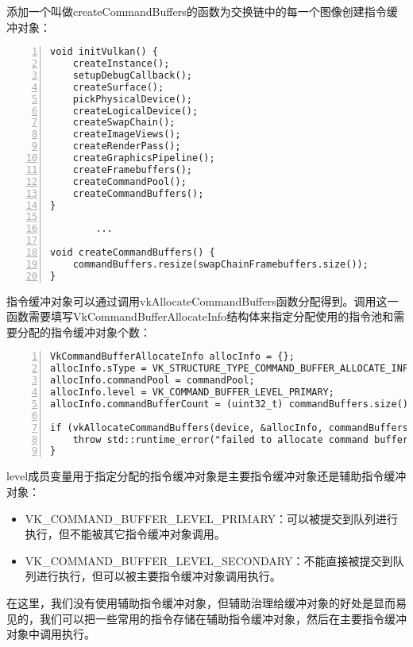 \documentclass{ctexart}
\begin{document}
添加一个叫做createCommandBuffers的函数为交换链中的每一个图像创建指令缓冲对象：

\begin{lstlisting}[language={[ANSI]C},keywordstyle=\color{blue!70},commentstyle=\color{red!50!green!50!blue!50},frame=shadowbox, rulesepcolor=\color{red!20!green!20!blue!20},basicstyle=\small,numbers=left, numberstyle=\tiny,breaklines=true]
void initVulkan() {
	createInstance();
	setupDebugCallback();
	createSurface();
	pickPhysicalDevice();
	createLogicalDevice();
	createSwapChain();
	createImageViews();
	createRenderPass();
	createGraphicsPipeline();
	createFramebuffers();
	createCommandPool();
	createCommandBuffers();
}

		...

void createCommandBuffers() {
	commandBuffers.resize(swapChainFramebuffers.size());
}
\end{lstlisting}

指令缓冲对象可以通过调用vkAllocateCommandBuffers函数分配得到。调用这一函数需要填写VkCommandBufferAllocateInfo结构体来指定分配使用的指令池和需要分配的指令缓冲对象个数：

\begin{lstlisting}[language={[ANSI]C},keywordstyle=\color{blue!70},commentstyle=\color{red!50!green!50!blue!50},frame=shadowbox, rulesepcolor=\color{red!20!green!20!blue!20},basicstyle=\small,numbers=left, numberstyle=\tiny,breaklines=true]
VkCommandBufferAllocateInfo allocInfo = {};
allocInfo.sType = VK_STRUCTURE_TYPE_COMMAND_BUFFER_ALLOCATE_INFO;
allocInfo.commandPool = commandPool;
allocInfo.level = VK_COMMAND_BUFFER_LEVEL_PRIMARY;
allocInfo.commandBufferCount = (uint32_t) commandBuffers.size();

if (vkAllocateCommandBuffers(device, &allocInfo, commandBuffers.data()) != VK_SUCCESS) {
	throw std::runtime_error("failed to allocate command buffers!");
}
\end{lstlisting}

level成员变量用于指定分配的指令缓冲对象是主要指令缓冲对象还是辅助指令缓冲对象：

\begin{itemize}
	\item VK\_COMMAND\_BUFFER\_LEVEL\_PRIMARY：可以被提交到队列进行执行，但不能被其它指令缓冲对象调用。
	\item VK\_COMMAND\_BUFFER\_LEVEL\_SECONDARY：不能直接被提交到队列进行执行，但可以被主要指令缓冲对象调用执行。
\end{itemize}

在这里，我们没有使用辅助指令缓冲对象，但辅助治理给缓冲对象的好处是显而易见的，我们可以把一些常用的指令存储在辅助指令缓冲对象，然后在主要指令缓冲对象中调用执行。
\end{document}
